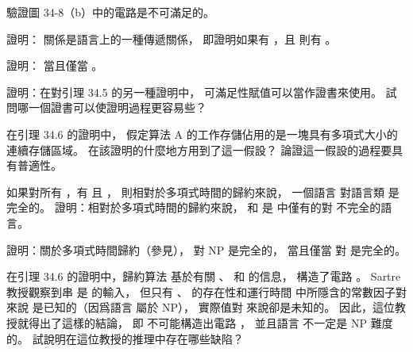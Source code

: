 \startsection[
  title={NP-completeness and reducibility},
]

\startEXERCISE
驗證圖 34-8（b）中的電路是不可滿足的。
\stopEXERCISE

\startANSWER
{}
\stopANSWER

\startEXERCISE
證明：  關係是語言上的一種傳遞關係，
即證明如果有 ，且  則有 。
\stopEXERCISE

\startANSWER
{}
\stopANSWER

\startEXERCISE
證明：  當且僅當 。
\stopEXERCISE

\startANSWER
{}
\stopANSWER

\startEXERCISE
證明：在對引理 34.5 的另一種證明中，
可滿足性賦值可以當作證書來使用。
試問哪一個證書可以使證明過程更容易些？
\stopEXERCISE

\startANSWER
{}
\stopANSWER

\startEXERCISE
在引理 34.6 的證明中，
假定算法 A 的工作存儲佔用的是一塊具有多項式大小的連續存儲區域。
在該證明的什麼地方用到了這一假設？
論證這一假設的過程要具有普適性。
\stopEXERCISE

\startANSWER
{}
\stopANSWER

\startEXERCISE[exercise:34.3-6]
如果對所有 ，有  且 ，
則相對於多項式時間的歸約來說，
一個語言  對語言類  是{\EMP 完全的}。
證明：相對於多項式時間的歸約來說，
 \m{\phi} 和  是  中僅有的對  不完全的語言。
\stopEXERCISE

\startANSWER
{}
\stopANSWER

\startEXERCISE[exercise:34.3-7]
證明：關於多項式時間歸約（參見），
  對 NP 是完全的，
當且僅當  對  是完全的。
\stopEXERCISE

\startANSWER
{}
\stopANSWER

\startEXERCISE
在引理 34.6 的證明中，歸約算法  基於有關 、  和  的信息，
構造了電路 。
 Sartre 教授觀察到串  是  的輸入，
但只有 、  的存在性和運行時間  中所隱含的常數因子對  來說
是已知的（因爲語言  屬於 NP），
實際值對  來說卻是未知的。
因此，這位教授就得出了這樣的結論，
即  不可能構造出電路 ，
並且語言  不一定是 NP 難度的。
試說明在這位教授的推理中存在哪些缺陷？
\stopEXERCISE

\startANSWER
{}
\stopANSWER

\stopsection
